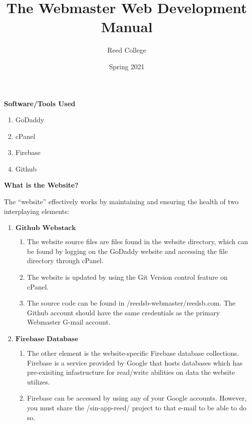 \documentclass[a4paper]{article}
\title{The Webmaster Web Development Manual}
\author{Reed College}
\date{Spring 2021}
\begin{document}
\maketitle

\begin{center}
\textbf{Software/Tools Used}
\end{center}

\begin{enumerate}
  \item GoDaddy
  \item cPanel
  \item Firebase
  \item Github
\end{enumerate}

\begin{center}
\textbf{What is the Website?}
\end{center}
The ``website'' effectively works by maintaining and ensuring the health of two interplaying elements:

\begin{enumerate}
  \item $\textbf{Github Webstack}$
    \begin{enumerate}
      \item The website source files are files found in the website directory, which can be found by logging on the GoDaddy website and accessing the file directory through cPanel.
      \item The website is updated by using the Git Version control feature on cPanel.
      \item The source code can be found in /reedsb-webmaster/reedsb.com. The Github account should have the same credentials as the primary Webmaster G-mail account.
    \end{enumerate}
  \item $\textbf{Firebase Database}$
    \begin{enumerate}
      \item The other element is the website-specific Firebase database collections. Firebase is a service provided by Google that hosts databases which has pre-exisiting infastructure for read/write abilities on data the website utilizes.
      \item Firebase can be accessed by using any of your Google accounts. However, you must share the /sin-app-reed/ project to that e-mail to be able to do so.
    \end{enumerate}
\end{enumerate}
\end{document}
